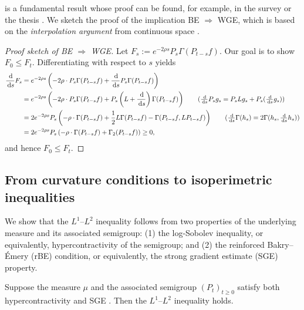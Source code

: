  is a fundamental result whose proof can be found, for example, in the survey \cite{Salez-survey} or the thesis \cite{Kamtue-thesis}.
We sketch the proof of the implication BE $\Rightarrow$ WGE, which is based on the \emph{interpolation argument} from continuous space \cite{BGL-book}.
\begin{proof}[Proof sketch of BE $\Rightarrow$ WGE]
    Let $F_s := e^{-2\rho s} P_s \Gamma(P_{t-s} f)$. Our goal is to show $F_0 \le F_t$.
    Differentiating with respect to $s$ yields
    \begin{align*}
        \frac{\dif}{\dif s} F_s 
        &= e^{-2\rho s}\left( - 2 \rho \cdot P_s \Gamma(P_{t-s} f) + \frac{\dif}{\dif s} P_s \Gamma(P_{t-s} f) \right) \\
        &= e^{-2\rho s}\left( - 2 \rho \cdot P_s \Gamma(P_{t-s} f) + P_s \left( L + \frac{\dif}{\dif s} \right) \Gamma(P_{t-s} f) \right) \tag{$\frac{\dif}{\dif s} P_s g_s = P_s L g_s + P_s (\frac{\dif}{\dif s} g_s)$} \\
        &= 2 e^{-2\rho s} P_s \left( - \rho \cdot \Gamma(P_{t-s} f) + \frac{1}{2} L \Gamma(P_{t-s} f) - \Gamma(P_{t-s} f, L P_{t-s} f) \right) \tag{$\frac{\dif}{\dif s} \Gamma(h_s) = 2 \Gamma(h_s, \frac{\dif}{\dif s} h_s)$} \\
        &= 2 e^{-2\rho s} P_s \left( - \rho \cdot \Gamma(P_{t-s} f) + \Gamma_2(P_{t-s} f) \right) \ge 0,
    \end{align*}
    and hence $F_0 \le F_t$.
\end{proof}


\subsection{From curvature conditions to isoperimetric inequalities}

We show that the $L^1$--$L^2$ inequality  follows from two properties of the underlying measure and its associated semigroup: 
(1) the log-Sobolev inequality, or equivalently, hypercontractivity of the semigroup; and
(2) the reinforced Bakry--\'Emery (rBE) condition, or equivalently, the strong gradient estimate (SGE) property.

\begin{theorem}
\label{thm:intro-L1-L2}
    Suppose the measure $\mu$ and the associated semigroup $(P_t)_{t \ge 0}$ satisfy both hypercontractivity  and SGE . Then the $L^1$--$L^2$ inequality  holds.
\end{theorem}

